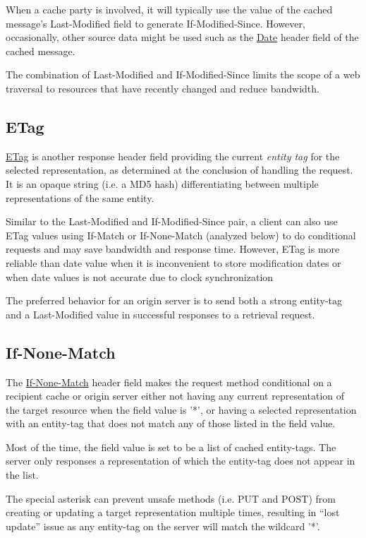 When a cache party is involved, it will typically use the value of
the cached message's Last-Modified field to generate
If-Modified-Since. However, occasionally, other source data might
be used such as the \uline{Date} header field of the cached
message.

The combination of Last-Modified and If-Modified-Since limits the
scope of a web traversal to resources that have recently changed
and reduce bandwidth.

\subsection{ETag}
\label{sec:etag}

\uline{ETag} is another response header field providing the
current \textit{entity tag} for the selected representation, as
determined at the conclusion of handling the request. It is an
opaque string (i.e. a MD5 hash) differentiating between multiple
representations of the same entity.

Similar to the Last-Modified and If-Modified-Since pair, a client
can also use ETag values using If-Match or If-None-Match (analyzed
below) to do conditional requests and may save bandwidth and
response time. However, ETag is more reliable than date value when
it is inconvenient to store modification dates or when date values
is not accurate due to clock synchronization

The preferred behavior for an origin server is to send both a
strong entity-tag and a Last-Modified value in successful
responses to a retrieval request.

\subsection{If-None-Match}
\label{sec:if-none-match}

The \uline{If-None-Match} header field makes the request method
conditional on a recipient cache or origin server either not
having any current representation of the target resource when the
field value is '*', or having a selected representation with an
entity-tag that does not match any of those listed in the field
value.

Most of the time, the field value is set to be a list of cached
entity-tags. The server only responses a representation of which
the entity-tag does not appear in the list.

The special asterisk can prevent unsafe methods (i.e. PUT and
POST) from creating or updating a target representation multiple
times, resulting in ``lost update'' issue as any entity-tag on the
server will match the wildcard '*'.

